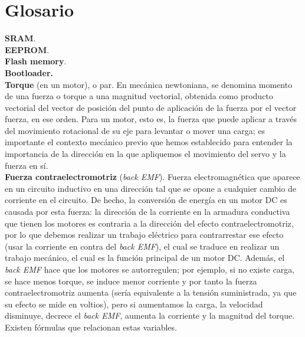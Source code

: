 \documentclass[12pt]{article}
\begin{document}
	\section*{Glosario}
	
	\noindent \textbf{\large SRAM}. \\
	
	\noindent \textbf{\large EEPROM}. \\
	
	\noindent \textbf{\large Flash memory}. \\
	
	\noindent \textbf{\large Bootloader.} \\
	
	\noindent \textbf{\large Torque} (en un motor), o par. En mecánica newtoniana, se denomina momento de una fuerza o torque a una magnitud vectorial, obtenida como producto vectorial del vector de posición del punto de aplicación de la fuerza por el vector fuerza, en ese orden. Para un motor, esto es, la fuerza que puede aplicar a través del movimiento rotacional de su eje para levantar o mover una carga; es importante el contexto mecánico previo que hemos establecido para entender la importancia de la dirección en la que apliquemos el movimiento del servo y la fuerza en sí.\\
	
	\noindent \textbf{\large Fuerza contraelectromotriz} (\textit{back EMF}). Fuerza electromagnética que aparece en un circuito inductivo en una dirección tal que se opone a cualquier cambio de corriente en el circuito. De hecho, la conversión de energía en un motor DC es causada por esta fuerza: la dirección de la corriente en la armadura conductiva que tienen los motores es contraria a la dirección del efecto contraelectromotriz, por lo que debemos realizar un trabajo eléctrico para contrarrestar ese efecto (usar la corriente en contra del \textit{back EMF}), el cual se traduce en realizar un trabajo mecánico, el cual es la función principal de un motor DC. Además, el \textit{back EMF} hace que los motores se autorregulen; por ejemplo, si no existe carga, se hace menos torque, se induce menor corriente y por tanto la fuerza contraelectromotriz aumenta (sería equivalente a la tensión suministrada, ya que su efecto se mide en voltios), pero si aumentamos la carga, la velocidad disminuye, decrece el \textit{back EMF}, aumenta la corriente y la magnitud del torque. Existen fórmulas que relacionan estas variables.\\
	
\end{document}
